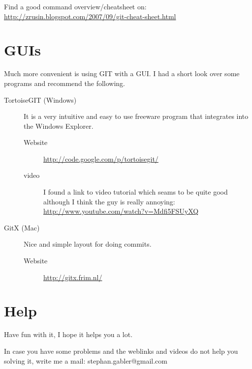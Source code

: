 \documentclass[]{article}
\begin{document}
Find a good command overview/cheatsheet on: \\ \url{http://zrusin.blogspot.com/2007/09/git-cheat-sheet.html}

\section{GUIs} %
\label{sg:sec:guis}

Much more convenient is using GIT with a GUI. I had a short look over some programs and recommend the following.

\begin{description}
	\item[TortoiseGIT (Windows)] 
	It is a very intuitive and easy to use freeware program that integrates into the Windows Explorer.
	\begin{description}
		\item[Website] \url{http://code.google.com/p/tortoisegit/}
		\item[video] I found a link to video tutorial which seams to be quite good although I think the guy is really annoying: \url{http://www.youtube.com/watch?v=Mdfi5FSUyXQ} 
	\end{description} 
	
	\item[GitX (Mac)] Nice and simple layout for doing commits.
	\begin{description}
		\item[Website] \url{http://gitx.frim.nl/}
	\end{description}
\end{description}




\section{Help} %
\label{sg:sec:help}

Have fun with it, I hope it helps you a lot. 

In case you have some problems and the weblinks and videos do not help
you solving it, write me a mail: stephan.gabler@gmail.com


\end{document}

